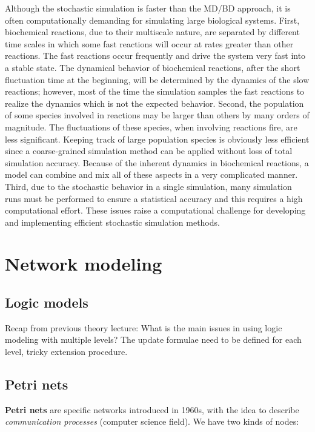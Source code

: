 Although the stochastic simulation is faster than the MD/BD approach, it is often computationally demanding for simulating large biological systems.
First, biochemical reactions, due to their multiscale nature, are separated by different time scales in which some fast reactions will occur at rates greater than other reactions.
The fast reactions occur frequently and drive the system very fast into a stable state.
The dynamical behavior of biochemical reactions, after the short fluctuation time at the beginning, will be determined by the dynamics of the slow reactions; however, most of the time the simulation samples the fast reactions to realize the dynamics which is not the expected behavior.
Second, the population of some species involved in reactions may be larger than others by many orders of magnitude.
The fluctuations of these species, when involving reactions fire, are less significant.
Keeping track of large population species is obviously less efficient since a coarse-grained simulation method can be applied without loss of total simulation accuracy.
Because of the inherent dynamics in biochemical reactions, a model can combine and mix all of these aspects in a very complicated manner.
Third, due to the stochastic behavior in a single simulation, many simulation runs must be performed to ensure a statistical accuracy and this requires a high computational effort.
These issues raise a computational challenge for developing and implementing efficient stochastic simulation methods.

\section{Network modeling}

  \subsection{Logic models}
  Recap from previous theory lecture: What is the main issues in using logic modeling with multiple levels? The update formulae need to be defined for each level, tricky extension procedure.

  \subsection{Petri nets}
  \textbf{Petri nets} are specific networks introduced in 1960s, with the idea to describe \emph{communication processes} (computer science field).
  We have two kinds of nodes:

